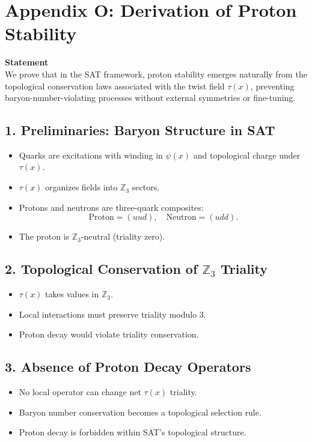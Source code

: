\documentclass[12pt]{article}
\begin{document}
\newpage
\section*{Appendix O: Derivation of Proton Stability}

\textbf{Statement} \\
We prove that in the SAT framework, proton stability emerges naturally from the topological conservation laws associated with the twist field \(\tau(x)\), preventing baryon-number-violating processes without external symmetries or fine-tuning.

\subsection*{1. Preliminaries: Baryon Structure in SAT}
\begin{itemize}
    \item Quarks are excitations with winding in \(\psi(x)\) and topological charge under \(\tau(x)\).
    \item \(\tau(x)\) organizes fields into \(\mathbb{Z}_3\) sectors.
    \item Protons and neutrons are three-quark composites:
    \[
    \text{Proton} = (uud), \quad \text{Neutron} = (udd).
    \]
    \item The proton is \(\mathbb{Z}_3\)-neutral (triality zero).
\end{itemize}

\subsection*{2. Topological Conservation of \(\mathbb{Z}_3\) Triality}
\begin{itemize}
    \item \(\tau(x)\) takes values in \(\mathbb{Z}_3\).
    \item Local interactions must preserve triality modulo 3.
    \item Proton decay would violate triality conservation.
\end{itemize}

\subsection*{3. Absence of Proton Decay Operators}
\begin{itemize}
    \item No local operator can change net \(\tau(x)\) triality.
    \item Baryon number conservation becomes a topological selection rule.
    \item Proton decay is forbidden within SAT’s topological structure.
\end{itemize}
\end{document}

